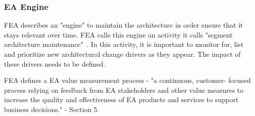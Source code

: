     
\subsubsection{EA Engine}

FEA describes an "engine" to maintain the architecture in order ensure that it stays relevant over time. FEA calls this engine an activity it calls "segment architecture maintenance"~\cite{FEA_PMO2007}. In this activity, it is important to monitor for, list and prioritize new architectural change drivers as they appear. The impact of these drivers needs to be defined. 


FEA  defines  a EA value measurement process -  "a continuous, customer- focused process relying on feedback from EA stakeholders and other value measures to increase the quality and effectiveness of EA products and services to support business decisions." \cite{FEA_PMO2007} - Section 5.




